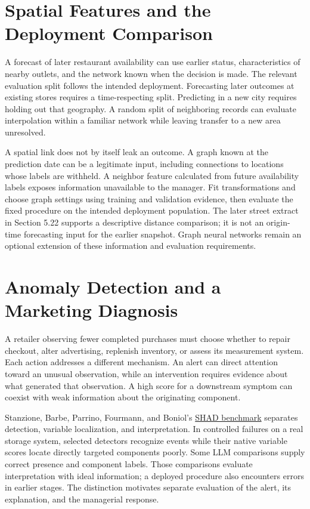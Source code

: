 \hypertarget{M07-spatial-features-and-the-deployment-comparison}{%
\section{Spatial Features and the Deployment
Comparison}\label{M07-spatial-features-and-the-deployment-comparison}}

\noindent \noindent A forecast of later restaurant availability can use earlier
status, characteristics of nearby outlets, and the network known when
the decision is made. The relevant evaluation split follows the intended
deployment. Forecasting later outcomes at existing stores requires a
time-respecting split. Predicting in a new city requires holding out
that geography. A random split of neighboring records can evaluate
interpolation within a familiar network while leaving transfer to a new
area unresolved.

A spatial link does not by itself leak an outcome. A graph known at the
prediction date can be a legitimate input, including connections to
locations whose labels are withheld. A neighbor feature calculated from
future availability labels exposes information unavailable to the
manager. Fit transformations and choose graph settings using training
and validation evidence, then evaluate the fixed procedure on the
intended deployment population. The later street extract in Section 5.22
supports a descriptive distance comparison; it is not an origin-time
forecasting input for the earlier snapshot. Graph neural networks remain
an optional extension of these information and evaluation requirements.

\hypertarget{M07-anomaly-detection-and-a-marketing-diagnosis}{%
\section{Anomaly Detection and a Marketing
Diagnosis}\label{M07-anomaly-detection-and-a-marketing-diagnosis}}

\noindent \noindent A retailer observing fewer completed purchases must choose
whether to repair checkout, alter advertising, replenish inventory, or
assess its measurement system. Each action addresses a different
mechanism. An alert can direct attention toward an unusual observation,
while an intervention requires evidence about what generated that
observation. A high score for a downstream symptom can coexist with weak
information about the originating component.

Stanzione, Barbe, Parrino, Fourmann, and Boniol's
\href{https://arxiv.org/abs/2610.01168v1}{SHAD benchmark} separates
detection, variable localization, and interpretation. In controlled
failures on a real storage system, selected detectors recognize events
while their native variable scores locate directly targeted components
poorly. Some LLM comparisons supply correct presence and component
labels. Those comparisons evaluate interpretation with ideal
information; a deployed procedure also encounters errors in earlier
stages. The distinction motivates separate evaluation of the alert, its
explanation, and the managerial response.

